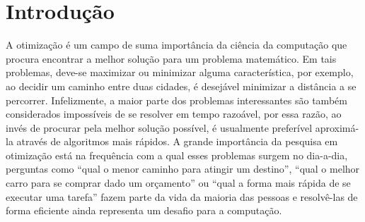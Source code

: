 \chapter[Introdução]{Introdução}

A otimização é um campo de suma importância da ciência da computação que procura encontrar a melhor solução para um problema matemático. Em tais problemas, deve-se maximizar ou minimizar alguma característica, por exemplo, ao decidir um caminho entre duas cidades, é desejável minimizar a distância a se percorrer. Infelizmente, a maior parte dos problemas interessantes são também considerados impossíveis de se resolver em tempo razoável, por essa razão, ao invés de procurar pela melhor solução possível, é usualmente preferível aproximá-la através de algoritmos mais rápidos. A grande importância da pesquisa em otimização está na frequência com a qual esses problemas surgem no dia-a-dia, perguntas como ``qual o menor caminho para atingir um destino'', ``qual o melhor carro para se comprar dado um orçamento'' ou ``qual a forma mais rápida de se executar uma tarefa'' fazem parte da vida da maioria das pessoas e resolvê-las de forma eficiente ainda representa um desafio para a computação.

